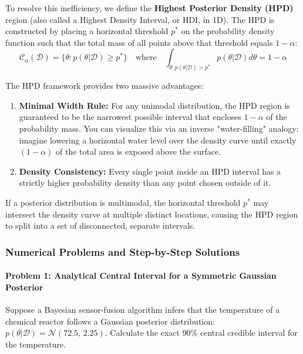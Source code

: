 \documentclass{article}
\begin{document}
To resolve this inefficiency, we define the \textbf{Highest Posterior Density (HPD)} region (also called a Highest Density Interval, or HDI, in 1D). The HPD is constructed by placing a horizontal threshold $p^*$ on the probability density function such that the total mass of all points above that threshold equals $1-\alpha$:
\begin{equation}
\mathcal{C}_{\alpha}(\mathcal{D}) = \{ \theta : p(\theta|\mathcal{D}) \ge p^* \} \quad \text{where} \quad \int_{\theta : p(\theta|\mathcal{D}) > p^*} p(\theta|\mathcal{D})d\theta = 1 - \alpha
\end{equation}



The HPD framework provides two massive advantages:
\begin{enumerate}
    \item \textbf{Minimal Width Rule:} For any unimodal distribution, the HPD region is guaranteed to be the narrowest possible interval that encloses $1-\alpha$ of the probability mass. You can visualize this via an inverse "water-filling" analogy: imagine lowering a horizontal water level over the density curve until exactly $(1-\alpha)$ of the total area is exposed above the surface. 
    \item \textbf{Density Consistency:} Every single point inside an HPD interval has a strictly higher probability density than any point chosen outside of it.
\end{enumerate}

If a posterior distribution is multimodal, the horizontal threshold $p^*$ may intersect the density curve at multiple distinct locations, causing the HPD region to split into a set of disconnected, separate intervals. 

\subsubsection{Numerical Problems and Step-by-Step Solutions}

\paragraph{Problem 1: Analytical Central Interval for a Symmetric Gaussian Posterior}
Suppose a Bayesian sensor-fusion algorithm infers that the temperature of a chemical reactor follows a Gaussian posterior distribution: $p(\theta|\mathcal{D}) = \mathcal{N}(72.5, \, 2.25)$. Calculate the exact $90\%$ central credible interval for the temperature.
\end{document}
